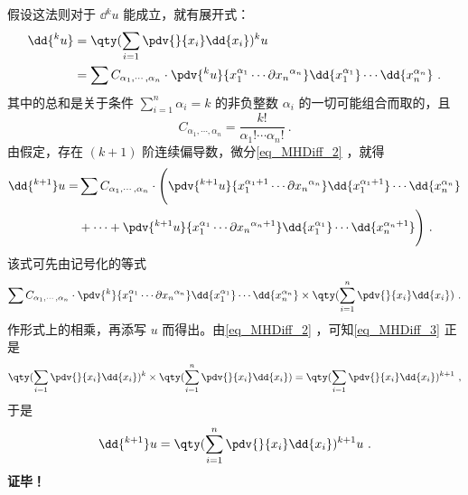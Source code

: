  假设这法则对于 $\dd{^k u}$ 能成立，就有展开式：
 \begin{equation}\label{eq_MHDiff_2}
 \begin{aligned}
 \dd{^k u}&=\qty(\sum_{i=1}\pdv{}{x_i}\dd{x_i})^k u\\
 &=\sum C_{\alpha_1,\cdots,\alpha_n}\cdot\pdv{^k u}{x_1^{\alpha_1}\cdots\partial{x_n}^{\alpha_n}}\dd{x_1^{\alpha_1}}\cdots\dd{x_n^{\alpha_n}}~.
 \end{aligned}
 \end{equation}
 其中的总和是关于条件 $\sum_{i=1}^n\alpha_i=k$ 的非负整数 $\alpha_i$ 的一切可能组合而取的，且
 \begin{equation}
 C_{\alpha_1,\cdots,\alpha_n}=\frac{k!}{\alpha_1!\cdots\alpha_n!}~.
 \end{equation}
 由假定，存在 $(k+1)$ 阶连续偏导数，微分\autoref{eq_MHDiff_2} ，就得
 \begin{equation}
  \begin{aligned}
 \dd{^{k+1}}u=&\sum C_{\alpha_1,\cdots,\alpha_n}\cdot\Bigg(\pdv{^{k+1} u}{x_1^{\alpha_1+1}\cdots\partial{x_n}^{\alpha_n}}\dd{x_1^{\alpha_1+1}}\cdots\dd{x_n^{\alpha_n}}\\
 &+\cdots+\pdv{^{k+1} u}{x_1^{\alpha_1}\cdots\partial{x_n}^{\alpha_n+1}}\dd{x_1^{\alpha_1}}\cdots\dd{x_n^{\alpha_n+1}}\Bigg)~.
 \end{aligned}
 \end{equation}
 该式可先由记号化的等式
 \begin{equation}\label{eq_MHDiff_3}
 \sum C_{\alpha_1,\cdots,\alpha_n}\cdot\pdv{^{k} }{x_1^{\alpha_1}\cdots\partial{x_n}^{\alpha_n}}\dd{x_1^{\alpha_1}}\cdots\dd{x_n^{\alpha_n}}\times\qty(\sum_{i=1}^n\pdv{}{x_i}\dd{x_i})~.
 \end{equation}
 作形式上的相乘，再添写 $u$ 而得出。由\autoref{eq_MHDiff_2} ，可知\autoref{eq_MHDiff_3} 正是
 \begin{equation}
 \qty(\sum_{i=1}\pdv{}{x_i}\dd{x_i})^k\times\qty(\sum_{i=1}^n\pdv{}{x_i}\dd{x_i})=\qty(\sum_{i=1}\pdv{}{x_i}\dd{x_i})^{k+1}~,
 \end{equation}
 于是
 \begin{equation}
 \dd{^{k+1}}u=\qty(\sum_{i=1}^n \pdv{}{x_i}\dd{x_i})^{k+1}u~.
 \end{equation}
 \textbf{证毕！}
